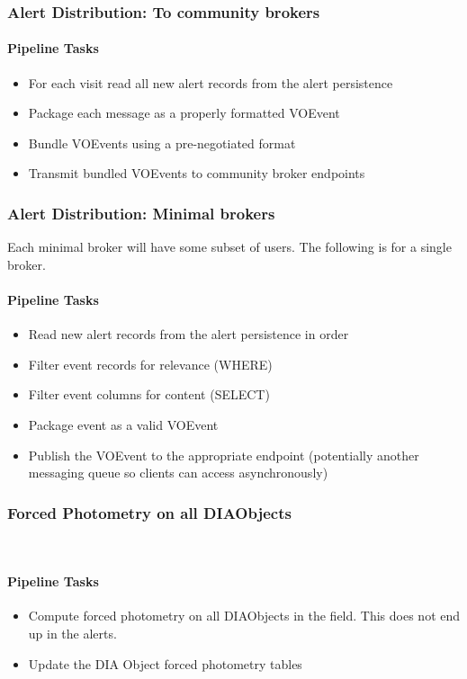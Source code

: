 \subsubsection{Alert Distribution: To community brokers}

\paragraph{Pipeline Tasks}
\begin{itemize}
\item For each visit read all new alert records from the alert persistence
\item Package each message as a properly formatted VOEvent
\item Bundle VOEvents using a pre-negotiated format
\item Transmit bundled VOEvents to community broker endpoints
\end{itemize}

\subsubsection{Alert Distribution: Minimal brokers}
\noindent
Each minimal broker will have some subset of users.  The following is for a single broker.

\paragraph{Pipeline Tasks}
\begin{itemize}
\item Read new alert records from the alert persistence in order
\item Filter event records for relevance (WHERE)
\item Filter event columns for content (SELECT)
\item Package event as a valid VOEvent
\item Publish the VOEvent to the appropriate endpoint (potentially another messaging queue so clients can access asynchronously)
\end{itemize}

\subsubsection{Forced Photometry on all DIAObjects}~

\paragraph{Pipeline Tasks}
\begin{itemize}
\item Compute forced photometry on all DIAObjects in the field.  This
  does not end up in the alerts.
\item Update the DIA Object forced photometry tables
\end{itemize}

